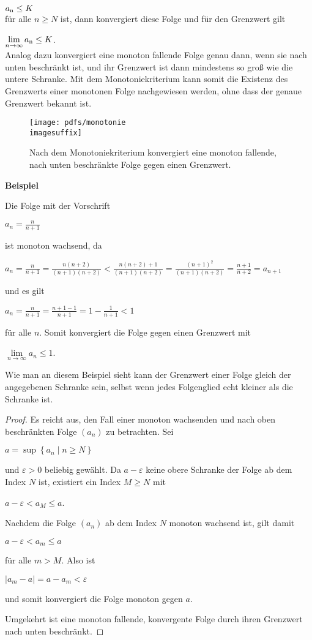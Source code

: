 $a \textsubscript{n} \leq K$ \\

für alle $n \geq N$ ist, dann konvergiert diese Folge und für den Grenzwert gilt

$ \lim\limits_{n \to \infty} a\textsubscript{n} \leq K$.\\

Analog dazu konvergiert eine monoton fallende Folge genau dann, wenn sie nach unten beschränkt ist, und ihr Grenzwert ist dann mindestens so groß wie die untere Schranke. Mit dem Monotoniekriterium kann somit die Existenz des Grenzwerts einer monotonen Folge nachgewiesen werden, ohne dass der genaue Grenzwert bekannt ist.

\newpage

\begin{figure}
  \centering
	\texttt{[image: pdfs/monotonie\\imagesuffix]}
  \caption[MonotonieKriterium in Action]{Nach dem Monotoniekriterium konvergiert eine monoton fallende, nach unten beschränkte Folge gegen einen Grenzwert.}
  \label{monotoni_1}
\end{figure}

\textbf{Beispiel}

Die Folge mit der Vorschrift

$a_{n} ={\frac {n}{n+1}}$

ist monoton wachsend, da

$a_{n}={\frac {n}{n+1}}={\frac {n(n+2)}{(n+1)(n+2)}}<{\frac {n(n+2)+1}{(n+1)(n+2)}}={\frac {(n+1)^{2}}{(n+1)(n+2)}}={\frac {n+1}{n+2}}=a_{n+1}$

und es gilt

$a_{n}={\frac {n}{n+1}}={\frac {n+1-1}{n+1}}=1-{\frac {1}{n+1}}<1$

für alle $n$. Somit konvergiert die Folge gegen einen Grenzwert mit

$ \lim\limits_{n \to \infty} a_{n} \leq 1$.


Wie man an diesem Beispiel sieht kann der Grenzwert einer Folge gleich der angegebenen Schranke sein, selbst wenn jedes Folgenglied echt kleiner als die Schranke ist.
\newpage
\begin{proof}
Es reicht aus, den Fall einer monoton wachsenden und nach oben beschränkten Folge $(a_{n})$ zu betrachten. Sei

$a=\sup \left\{a_{n}\mid n\geq N\right\}$

und $\varepsilon >0$ beliebig gewählt. Da $a-\varepsilon$ keine obere Schranke der Folge ab dem Index $N$ ist, existiert ein Index $M\geq N$ mit

$a-\varepsilon < a_{M} \leq a$.

Nachdem die Folge $(a_{n})$ ab dem Index $N$ monoton wachsend ist, gilt damit

$a-\varepsilon < a_{m} \leq a$

für alle $m > M$. Also ist

$|a_{m}-a|=a-a_{m}<\varepsilon$

und somit konvergiert die Folge monoton gegen $a$.

Umgekehrt ist eine monoton fallende, konvergente Folge durch ihren Grenzwert nach unten beschränkt.
\end{proof}

